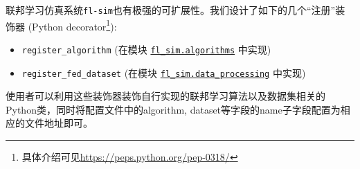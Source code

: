联邦学习仿真系统\texttt{fl-sim}也有极强的可扩展性。我们设计了如下的几个``注册''装饰器 (Python decorator\footnote{具体介绍可见\url{https://peps.python.org/pep-0318/}}):
\begin{itemize}
    \item \verb|register_algorithm| (在模块 \href{https://github.com/wenh06/fl-sim/blob/master/fl_sim/algorithms/_register.py}{\texttt{fl\_sim.algorithms}} 中实现)
    \item \verb|register_fed_dataset| (在模块 \href{https://github.com/wenh06/fl-sim/blob/master/fl_sim/data_processing/_register.py}{\texttt{fl\_sim.data\_processing}} 中实现)
\end{itemize}
使用者可以利用这些装饰器装饰自行实现的联邦学习算法以及数据集相关的Python类，同时将配置文件中的algorithm, dataset等字段的name子字段配置为相应的文件地址即可。
